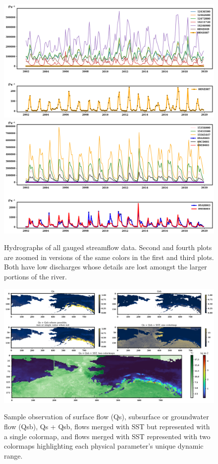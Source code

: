 \begin{figure}[!ht]
	\centering
    \caption{Hydrographs of all gauged streamflow data. Second and fourth plots are zoomed in versions of the same colors in the first and third plots. Both have low discharges whose details are lost amongst the larger portions of the river.}
	\includegraphics[width=1.0\linewidth]{m3/ims/fig3_2a.png}
    \includegraphics[width=1.0\linewidth]{m3/ims/fig3_2b.png}
    
	\label{fig3_2}
\end{figure}

\begin{figure}[!ht]
	\centering
    \caption{Sample observation of surface flow (Qs), subsurface or groundwater flow (Qsb), Qs + Qsb, flows merged with SST but represented with a single colormap, and flows merged with SST represented with two colormaps highlighting each physical parameter’s unique dynamic range.}
	\includegraphics[width=1.0\linewidth]{m3/ims/fig3_3.png}
	\label{fig3_3}
\end{figure}


